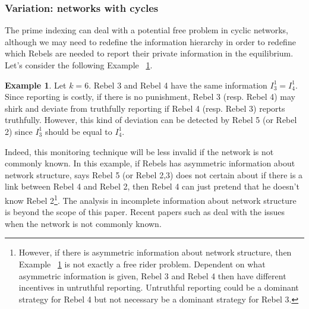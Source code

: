 \documentclass[12pt,letterpaper]{article}
\newtheorem*{main result}{Main Result}
\theoremstyle{definition}
\newtheorem{example}{Example}[section]
\theoremstyle{remark}
\theoremstyle{claim}
\begin{document}
\subsubsection{Variation: networks with cycles}

The prime indexing can deal with a potential free problem in cyclic networks, although we may need to redefine the information hierarchy in order to redefine which Rebels are needed to report their private information in the equilibrium. Let's consider the following Example ~\ref{ex_no_free_rider_cycle}.

\begin{example}
\label{ex_no_free_rider_cycle}
Let $k=6$. Rebel 3 and Rebel 4 have the same information $I^1_3=I^1_4$. Since reporting is costly, if there is no punishment, Rebel 3 (resp. Rebel 4) may shirk and deviate from truthfully reporting if Rebel 4 (resp. Rebel 3) reports truthfully. However, this kind of deviation can be detected by Rebel 5 (or Rebel 2) since $I^1_3$ should be equal to $I^1_4$. 

\begin{center}
\end{center}

\end{example}

Indeed, this monitoring technique will be less invalid if the network is not commonly known. In this example, if Rebels has asymmetric information about network structure, says Rebel 5 (or Rebel 2,3) does not certain about if there is a link between Rebel 4 and Rebel 2, then Rebel 4 can just pretend that he doesn't know Rebel 2\footnote{However, if there is asymmetric information about network structure, then Example ~\ref{ex_no_free_rider_cycle} is not exactly a free rider problem. Dependent on what asymmetric information is given, Rebel 3 and Rebel 4 then have different incentives in untruthful reporting. Untruthful reporting could be a dominant strategy for Rebel 4 but not necessary be a dominant strategy for Rebel 3.}. The analysis in incomplete information about network structure is beyond the scope of this paper. Recent papers such as \citep{Galeotti2010} deal with the issues when the network is not commonly known.
\end{document}
